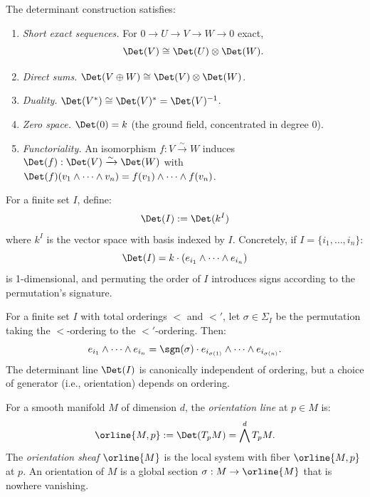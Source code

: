 \begin{proposition}
\label{prop:det-properties}
The determinant construction satisfies:
\begin{enumerate}[label=(\roman*)]
\item \emph{Short exact sequences.} For $0 \to U \to V \to W \to 0$ exact,
\[
\Det(V) \cong \Det(U) \otimes \Det(W).
\]
\item \emph{Direct sums.} $\Det(V \oplus W) \cong \Det(V) \otimes \Det(W)$.
\item \emph{Duality.} $\Det(V^*) \cong \Det(V)^* = \Det(V)^{-1}$.
\item \emph{Zero space.} $\Det(0) = k$ (the ground field, concentrated in degree 0).
\item \emph{Functoriality.} An isomorphism $f: V \xrightarrow{\sim} W$ induces
$\Det(f): \Det(V) \xrightarrow{\sim} \Det(W)$ with $\Det(f)(v_1 \wedge \cdots \wedge v_n)
= f(v_1) \wedge \cdots \wedge f(v_n)$.
\end{enumerate}
\end{proposition}

\begin{definition}
\label{def:det-set}
For a finite set $I$, define:
\[
\Det(I) := \Det(k^I)
\]
where $k^I$ is the vector space with basis indexed by $I$. Concretely, if
$I = \{i_1, \ldots, i_n\}$:
\[
\Det(I) = k \cdot (e_{i_1} \wedge \cdots \wedge e_{i_n})
\]
is 1-dimensional, and permuting the order of $I$ introduces signs according to
the permutation's signature.
\end{definition}

\begin{lemma}
\label{lem:det-ordering}
For a finite set $I$ with total orderings $<$ and $<'$, let $\sigma \in \Sigma_I$
be the permutation taking the $<$-ordering to the $<'$-ordering. Then:
\[
e_{i_1} \wedge \cdots \wedge e_{i_n} = \sgn(\sigma) \cdot e_{i_{\sigma(1)}} \wedge \cdots \wedge e_{i_{\sigma(n)}}.
\]
The determinant line $\Det(I)$ is canonically independent of ordering, but a
choice of generator (i.e., orientation) depends on ordering.
\end{lemma}

\begin{definition}
\label{def:orientation-line}
For a smooth manifold $M$ of dimension $d$, the \emph{orientation line} at
$p \in M$ is:
\[
\orline{M,p} := \Det(T_p M) = \bigwedge^d T_p M.
\]
The \emph{orientation sheaf} $\orline{M}$ is the local system with fiber
$\orline{M,p}$ at $p$. An orientation of $M$ is a global section
$\sigma: M \to \orline{M}$ that is nowhere vanishing.
\end{definition}

